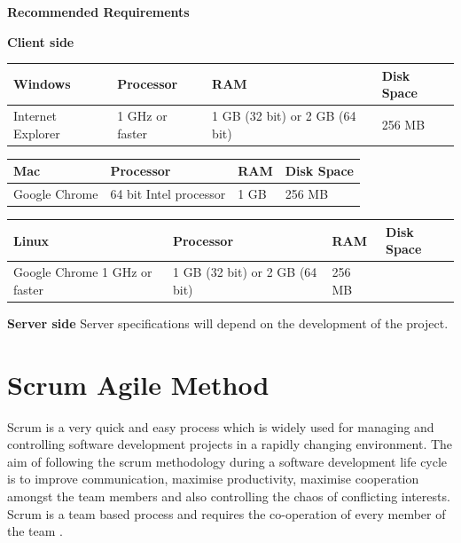 \documentclass[10pt,onecolumn]{MainDocument}
\begin{document}
\textbf{Recommended Requirements}
\begin{center}
	\textbf{Client side}\\
	\begin{tabular}{ | p{5cm} | p{4cm} | p{3cm} | p{3cm} |}
		\hline
		\textbf{Windows} & \textbf{Processor} & \textbf{RAM} & \textbf{Disk Space}\\ \hline
		Internet Explorer	&	1 GHz or faster	&	1 GB (32 bit) or 2 GB (64 bit)	&	256 MB		\\ \hline
	\end{tabular}
	
	
	\begin{tabular}{ | p{5cm} | p{4cm} | p{3cm} | p{3cm} |}
		\hline
		\textbf{Mac} & \textbf{Processor} & \textbf{RAM} & \textbf{Disk Space}\\				\hline
		Google Chrome	&	64 bit Intel processor	 &  1 GB  &	256 MB	\\ \hline
	\end{tabular}
	
	
	\begin{tabular}{ | p{5cm} | p{4cm} | p{3cm} | p{3cm} |}
		\hline
		\textbf{Linux} & \textbf{Processor} & \textbf{RAM} & \textbf{Disk Space}\\
		\hline
		Google Chrome		1 GHz or faster	&	1 GB (32 bit) or 2 GB (64 bit)	&	256 MB	\\ \hline
	\end{tabular}
	
	
	\textbf{Server side}
	Server specifications will depend on the development of the project.
\end{center}



\newpage



\section{Scrum Agile Method}

Scrum is a very quick and easy process which is widely used for managing and controlling software development projects in a rapidly changing environment. The aim of following the scrum methodology during a software development life cycle is to improve communication, maximise productivity, maximise cooperation amongst the team members and also controlling the chaos of conflicting interests. Scrum is a team based process and requires the co-operation of every member of the team \cite{SoftwareEngineering}. 
\end{document}
